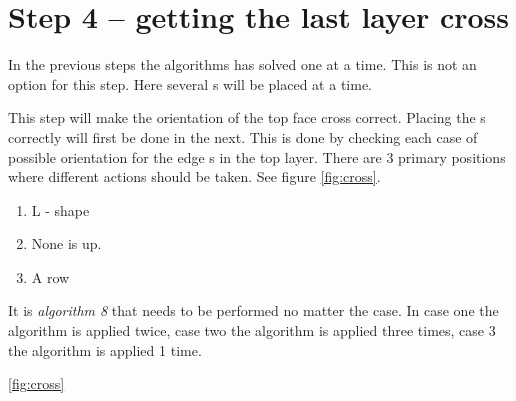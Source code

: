 \section{Step 4 --  getting the last layer cross}
In the previous steps the algorithms has solved one \cpiece{} at a time. 
This is not an option for this step. 
Here several \cpiece{}s will be placed at a time. 

This step will make the orientation of the top face cross correct. 
Placing the \cpiece{}s correctly will first be done in the next. 
This is done by checking each case of possible orientation for the edge \cpiece{}s in the top layer. 
There are 3 primary positions where different actions should be taken. See figure \ref{fig:cross}. 
\begin{enumerate}
\item L - shape
\item None is up.
\item A row
\end{enumerate}
It is \textit{algorithm 8} that needs to be performed no matter the case. In case one the algorithm is applied twice, case two the algorithm is applied three times, case 3 the algorithm is applied 1 time. 

\ref{fig:cross}


